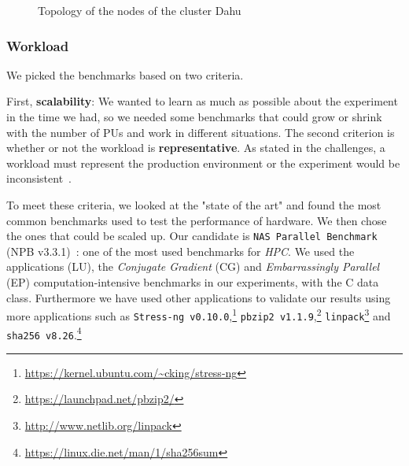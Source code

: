 \begin{figure}[htb]
    \caption{Topology of the nodes of the cluster \textsf{Dahu}}\label{fig:topo}
\end{figure}

\subsubsection{Workload}

We picked the benchmarks based on two criteria.

First, \textbf{scalability}: We wanted to learn as much as possible about the experiment in the time we had, so we needed some benchmarks that could grow or shrink with the number of PUs and work in different situations.
The second criterion is whether or not the workload is \textbf{representative}. As stated in the challenges, a workload must represent the production environment or the experiment would be inconsistent~\cite{stephen_evaluate_2012}.

To meet these criteria, we looked at the "state of the art" and found the most common benchmarks used to test the performance of hardware. We then chose the ones that could be scaled up.
Our candidate is \texttt{NAS Parallel Benchmark} (NPB v3.3.1)~\cite{Bailey:1991:NPB:125826.125925}: one of the most used benchmarks for \emph{HPC}. We used the applications (\textsf{LU}), the \emph{Conjugate Gradient} (\textsf{CG}) and \emph{Embarrassingly Parallel} (\textsf{EP}) computation-intensive benchmarks in our experiments, with the \textsf{C} data class.
Furthermore we have used other applications to validate our results using more applications such as \texttt{Stress-ng v0.10.0},\footnote{\url{https://kernel.ubuntu.com/~cking/stress-ng}} \texttt{pbzip2 v1.1.9},\footnote{\url{https://launchpad.net/pbzip2/}} \texttt{linpack}\footnote{\url{http://www.netlib.org/linpack}} and \texttt{sha256 v8.26}.\footnote{\url{https://linux.die.net/man/1/sha256sum}}


